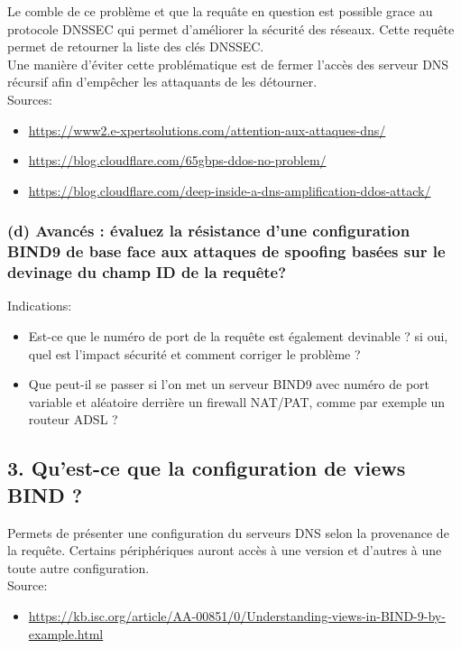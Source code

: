 \documentclass{article}
\begin{document}
Le comble de ce problème et que la requâte en question est possible grace au protocole DNSSEC qui permet d'améliorer la sécurité des réseaux. Cette requête permet de retourner la liste des clés DNSSEC.\\

Une manière d'éviter cette problématique est de fermer l'accès des serveur DNS récursif afin d'empêcher les attaquants de les détourner.\\

Sources:
\begin{itemize}
\item \url{https://www2.e-xpertsolutions.com/attention-aux-attaques-dns/}
\item \url{https://blog.cloudflare.com/65gbps-ddos-no-problem/}
\item \url{https://blog.cloudflare.com/deep-inside-a-dns-amplification-ddos-attack/}
\end{itemize}

\subsubsection*{(d) Avancés : évaluez la résistance d’une configuration BIND9 de base face aux attaques de spoofing basées sur le devinage du champ ID de la requête?}
Indications:
\begin{itemize}
\item Est-ce que le numéro de port de la requête est également devinable ? si oui, quel est l’impact sécurité et comment corriger le problème ?
\item Que peut-il se passer si l’on met un serveur BIND9 avec numéro de port variable et aléatoire derrière un firewall NAT/PAT, comme par exemple un routeur ADSL ?
\end{itemize}

\subsection*{3. Qu’est-ce que la configuration de views BIND ?}
Permets de présenter une configuration du serveurs DNS selon la provenance de la requête. Certains périphériques auront accès à une version et d'autres à une toute autre configuration.\\

Source:
\begin{itemize}
\item \url{https://kb.isc.org/article/AA-00851/0/Understanding-views-in-BIND-9-by-example.html}
\end{itemize}
\end{document}
